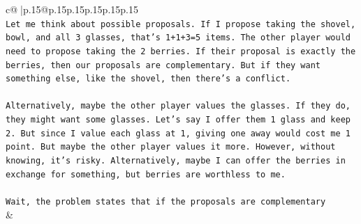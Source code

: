 \documentclass{article}
\begin{document}
{\begin{supertabular}{c@{$\;$}|p{.15\linewidth}@{}p{.15\linewidth}p{.15\linewidth}p{.15\linewidth}p{.15\linewidth}p{.15\linewidth}}
{{{\\ 
\texttt{Let me think about possible proposals. If I propose taking the shovel, bowl, and all 3 glasses, that's 1+1+3=5 items. The other player would need to propose taking the 2 berries. If their proposal is exactly the berries, then our proposals are complementary. But if they want something else, like the shovel, then there's a conflict.} \\
\\ 
\texttt{Alternatively, maybe the other player values the glasses. If they do, they might want some glasses. Let's say I offer them 1 glass and keep 2. But since I value each glass at 1, giving one away would cost me 1 point. But maybe the other player values it more. However, without knowing, it's risky. Alternatively, maybe I can offer the berries in exchange for something, but berries are worthless to me.} \\
\\ 
\texttt{Wait, the problem states that if the proposals are complementary} \\
            }
        }
    }
    & \\ \\


\end{supertabular}}
\end{document}
